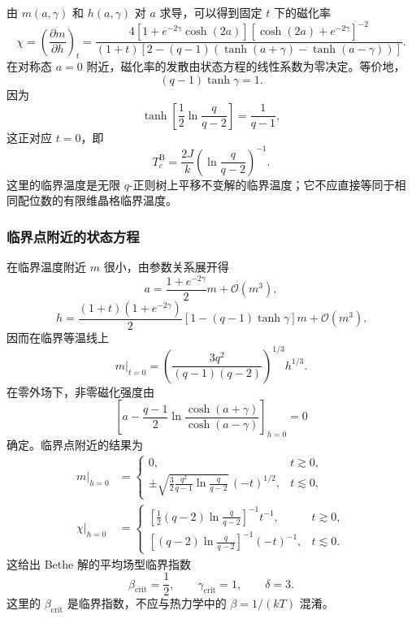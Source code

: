 由 \(m(a,\gamma)\) 和 \(h(a,\gamma)\) 对 \(a\) 求导，可以得到固定 \(t\) 下的磁化率
\begin{equation*}
	\chi=\left(\frac{\partial m}{\partial h}\right)_t
	=\frac{
	4\left[1+e^{-2\gamma}\cosh(2a)\right]
	\left[\cosh(2a)+e^{-2\gamma}\right]^{-2}}
	{(1+t)\left[
	2-(q-1)\left(\tanh(a+\gamma)-\tanh(a-\gamma)\right)
	\right]} .
\end{equation*}
在对称态 \(a=0\) 附近，磁化率的发散由状态方程的线性系数为零决定。等价地，
\begin{equation*}
	(q-1)\tanh\gamma=1.
\end{equation*}
因为
\begin{equation*}
	\tanh\left[\frac12\ln\frac q{q-2}\right]=\frac1{q-1},
\end{equation*}
这正对应 \(t=0\)，即
\[
	T_c^{\mathrm B}
	=\frac{2J}{k}\left(\ln\frac q{q-2}\right)^{-1}.
\]
这里的临界温度是无限 \(q\)-正则树上平移不变解的临界温度；它不应直接等同于相同配位数的有限维晶格临界温度。

\subsubsection{临界点附近的状态方程}

在临界温度附近 \(m\) 很小，由参数关系展开得
\begin{equation*}
	a=\frac{1+e^{-2\gamma}}2m+\mathcal O(m^3),
\end{equation*}
\begin{equation*}
	h=\frac{(1+t)(1+e^{-2\gamma})}{2}
	\left[1-(q-1)\tanh\gamma\right]m
	+\mathcal O(m^3).
\end{equation*}
因而在临界等温线上
\begin{equation*}
	\left.m\right|_{t=0}
	=\left(\frac{3q^2}{(q-1)(q-2)}\right)^{1/3}h^{1/3}.
\end{equation*}
在零外场下，非零磁化强度由
\begin{equation*}
	\left[
	a-\frac{q-1}{2}
	\ln\frac{\cosh(a+\gamma)}{\cosh(a-\gamma)}
	\right]_{h=0}=0
\end{equation*}
确定。临界点附近的结果为
\begin{align*}
\left.m\right|_{h=0}
&=
\begin{cases}
	0,&t\gtrsim0,\\
\displaystyle
\pm\sqrt{\frac32\frac{q^2}{q-1}
\ln\frac q{q-2}}\,(-t)^{1/2},&t\lesssim0,
\end{cases}\\
\left.\chi\right|_{h=0}
&=
\begin{cases}
\displaystyle
\left[\frac12(q-2)\ln\frac q{q-2}\right]^{-1}t^{-1},
	&t\gtrsim0,\\
\displaystyle
\left[(q-2)\ln\frac q{q-2}\right]^{-1}(-t)^{-1},
	&t\lesssim0.
\end{cases}
\end{align*}
这给出 Bethe 解的平均场型临界指数
\[
\beta_{\mathrm{crit}}=\frac12,\qquad
\gamma_{\mathrm{crit}}=1,\qquad
\delta=3.
\]
这里的 \(\beta_{\mathrm{crit}}\) 是临界指数，不应与热力学中的 \(\beta=1/(kT)\) 混淆。

